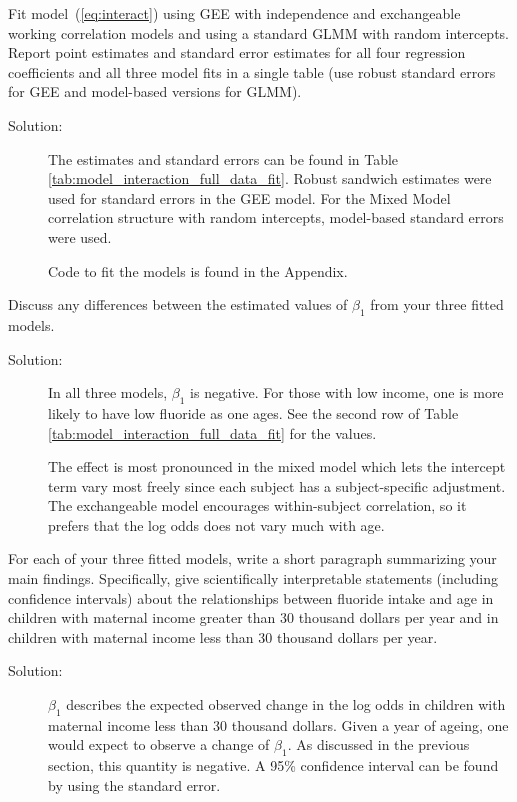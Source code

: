 \documentclass[11pt, letterpaper]{article}
\begin{document}
\begin{enumerate}[(a)]
{\em \item  Fit model~(\ref{eq:interact}) using GEE with independence and exchangeable working
correlation models and using a standard GLMM with random intercepts.  Report point estimates and standard error estimates 
for all four regression coefficients and all three model fits in a single table (use robust standard errors for GEE and model-based versions for GLMM).}

\begin{table}[ht]
  \scriptsize
  \centering
  
  \caption{Model fits of Equation \ref{eq:interact} with different correlation
    structures to the data in \texttt{fluoride.csv}.}
  \label{tab:model_interaction_full_data_fit}
\end{table}

\begin{description}
\item[Solution:] The estimates and standard errors can be found in Table
  \ref{tab:model_interaction_full_data_fit}. Robust sandwich estimates were used
  for standard errors in the GEE model. For the Mixed Model correlation
  structure with random intercepts, model-based standard errors were used.

  Code to fit the models is found in the Appendix.
\end{description}
{\em \item Discuss any differences between the estimated values of $\beta_1$ from your three fitted models.}
\begin{description}
\item[Solution:] In all three models, $\beta_1$ is negative. For those with low
  income, one is more likely to have low fluoride as one ages. See the second
  row of Table \ref{tab:model_interaction_full_data_fit} for the values.

  The effect is most pronounced in the mixed model which lets the intercept term
  vary most freely since each subject has a subject-specific adjustment. The
  exchangeable model encourages within-subject correlation, so it prefers that
  the log odds does not vary much with age.
\end{description}
{\em \item For each of your three fitted models, write a short paragraph summarizing your main findings.  Specifically, give scientifically interpretable statements (including confidence intervals) about the relationships between fluoride intake and age
in children with maternal income greater than 30 thousand dollars per year and
in children with maternal income less than 30 thousand dollars per year.}
\begin{description}
\item[Solution:] $\beta_1$ describes the expected observed change in the log
  odds in children with maternal income less than 30 thousand dollars. Given a
  year of ageing, one would expect to observe a change of $\beta_1$. As
  discussed in the previous section, this quantity is negative. A 95\%
  confidence interval can be found by using the standard error.


\end{description}
\end{enumerate}
\end{document}
